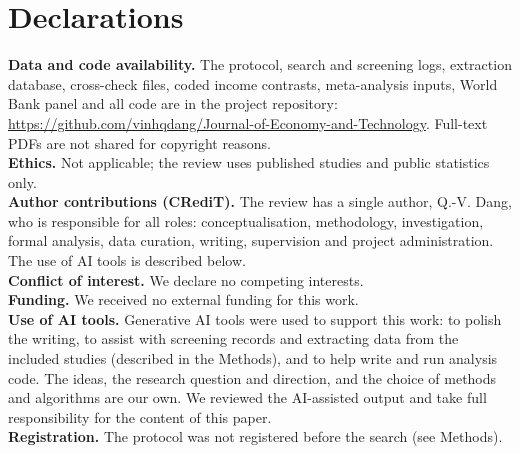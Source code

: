 \documentclass[11pt,a4paper]{article}
\begin{document}
\section*{Declarations}
\small
\noindent\textbf{Data and code availability.} The protocol, search and screening logs, extraction database, cross-check files, coded income contrasts, meta-analysis inputs, World Bank panel and all code are in the project repository: \url{https://github.com/vinhqdang/Journal-of-Economy-and-Technology}. Full-text PDFs are not shared for copyright reasons.\\
\textbf{Ethics.} Not applicable; the review uses published studies and public statistics only.\\
\textbf{Author contributions (CRediT).} The review has a single author, Q.-V. Dang, who is responsible for all roles: conceptualisation, methodology, investigation, formal analysis, data curation, writing, supervision and project administration. The use of AI tools is described below.\\
\textbf{Conflict of interest.} We declare no competing interests.\\
\textbf{Funding.} We received no external funding for this work.\\
\textbf{Use of AI tools.} Generative AI tools were used to support this work: to polish the writing, to assist with screening records and extracting data from the included studies (described in the Methods), and to help write and run analysis code. The ideas, the research question and direction, and the choice of methods and algorithms are our own. We reviewed the AI-assisted output and take full responsibility for the content of this paper.\\
\textbf{Registration.} The protocol was not registered before the search (see Methods).
\end{document}
